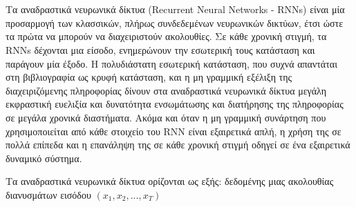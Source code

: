 \section{}

Τα αναδραστικά νευρωνικά δίκτυα (Recurrent Neural Networks - RNNs) είναι μία προσαρμογή των κλασσικών, πλήρως συνδεδεμένων νευρωνικών δικτύων, έτσι ώστε τα πρώτα να μπορούν να διαχειριστούν ακολουθίες. Σε κάθε χρονική στιγμή, τα RNNs δέχονται μια είσοδο, ενημερώνουν την εσωτερική τους κατάσταση και παράγουν μία έξοδο. Η πολυδιάστατη εσωτερική κατάσταση, που συχνά απαντάται στη βιβλιογραφία ως κρυφή κατάσταση, και η μη γραμμική εξέλιξη της διαχειριζόμενης πληροφορίας δίνουν στα αναδραστικά νευρωνικά δίκτυα μεγάλη εκφραστική ευελιξία και δυνατότητα ενσωμάτωσης και διατήρησης της πληροφορίας σε μεγάλα χρονικά διαστήματα. Ακόμα και όταν η μη γραμμική συνάρτηση που χρησιμοποιείται από κάθε στοιχείο του RNN είναι εξαιρετικά απλή, η χρήση της σε πολλά επίπεδα και η επανάληψη της σε κάθε χρονική στιγμή οδηγεί σε ένα εξαιρετικά δυναμικό σύστημα. 

Τα αναδραστικά νευρωνικά δίκτυα ορίζονται ως εξής: δεδομένης μιας ακολουθίας διανυσμάτων  εισόδου $(x_1, x_2, ..., x_T)$
